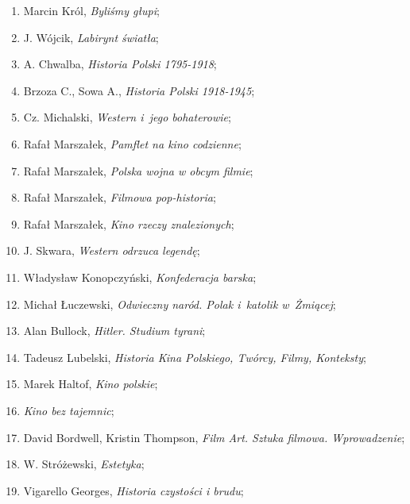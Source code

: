 \documentclass[a4paper,11pt]{article}
\begin{document}
\begin{enumerate}
\item Marcin Król, \textit{Byliśmy głupi};

\item J. Wójcik, \textit{Labirynt światła};

\item A. Chwalba, \textit{Historia Polski 1795-1918};

\item Brzoza C., Sowa A., \textit{Historia Polski 1918-1945};

\item Cz. Michalski, \textit{Western i~jego bohaterowie};

\item Rafał Marszałek, \textit{Pamflet na kino codzienne};

\item Rafał Marszałek, \textit{Polska wojna w obcym filmie};

\item Rafał Marszałek, \textit{Filmowa pop-historia};

\item Rafał Marszałek, \textit{Kino rzeczy znalezionych};

\item J. Skwara, \textit{Western odrzuca legendę};

\item Władysław Konopczyński, \textit{Konfederacja barska};

\item Michał Łuczewski, \textit{Odwieczny naród. Polak i~katolik
    w~Żmiącej};

\item Alan Bullock, \textit{Hitler. Studium tyrani};

\item Tadeusz Lubelski, \textit{Historia Kina Polskiego, Twórcy, Filmy,
    Konteksty};

\item Marek Haltof, \textit{Kino polskie};

\item \textit{Kino bez tajemnic};

\item David Bordwell, Kristin Thompson, \textit{Film Art. Sztuka
    filmowa. Wprowadzenie};

\item W. Stróżewski, \textit{Estetyka};

\item Vigarello Georges, \textit{Historia czystości i brudu};


\end{enumerate}
\end{document}
